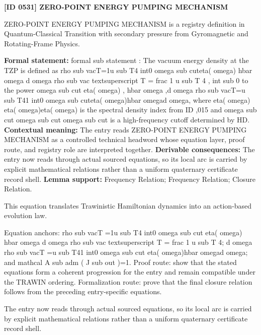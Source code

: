\clearpage
\noindent\textbf{[ID 0531] ZERO-POINT ENERGY PUMPING MECHANISM}\par
\vspace{0.35em}
\begingroup\small
{}
ZERO-POINT ENERGY PUMPING MECHANISM is a registry definition in Quantum-Classical Transition with secondary pressure from Gyromagnetic and Rotating-Frame Physics.

\begingroup\footnotesize\setlength{\emergencystretch}{3em}\sloppy
\textbf{Formal statement:} formal sub statement : The vacuum energy density at the TZP is defined as rho sub vacT=1u sub T4 int0 omega sub cuteta( omega) hbar omega d omega rho sub vac textsuperscript T = frac 1 u sub T 4 , int sub 0 to the power omega sub cut eta( omega) , hbar omega ,d omega rho sub vacT=u sub T41 int0 omega sub cuteta( omega)hbar omegad omega, where eta( omega) eta( omega)eta( omega) is the spectral density index from ID ,015 and omega sub cut omega sub cut omega sub cut is a high-frequency cutoff determined by HD. \textbf{Contextual meaning:} The entry reads ZERO-POINT ENERGY PUMPING MECHANISM as a controlled technical headword whose equation layer, proof route, and registry role are interpreted together. \textbf{Derivable consequences:} The entry now reads through actual sourced equations, so its local arc is carried by explicit mathematical relations rather than a uniform quaternary certificate record shell. \textbf{Lemma support:} Frequency Relation; Frequency Relation; Closure Relation.\par
\endgroup

This equation translates Trawinistic Hamiltonian dynamics into an action-based evolution law.

Equation anchors: rho sub vacT =1u sub T4 int0 omega sub cut eta( omega) hbar omega d omega rho sub vac textsuperscript T = frac 1 u sub T 4; d omega rho sub vacT =u sub T41 int0 omega sub cut eta( omega)hbar omegad omega; and mathcal A sub adm ( J sub out )=1. Proof route: show that the stated equations form a coherent progression for the entry and remain compatible under the TRAWIN ordering. Formalization route: prove that the final closure relation follows from the preceding entry-specific equations.

The entry now reads through actual sourced equations, so its local arc is carried by explicit mathematical relations rather than a uniform quaternary certificate record shell.
\endgroup


